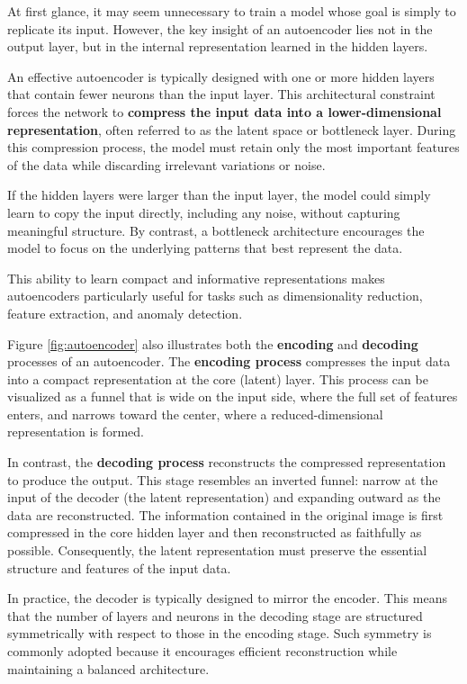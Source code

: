 At first glance, it may seem unnecessary to train a model whose goal is simply to replicate its input. However, the key insight of an autoencoder lies not in the output layer, but in the internal representation learned in the hidden layers.

An effective autoencoder is typically designed with one or more hidden layers that contain fewer neurons than the input layer. This architectural constraint forces the network to \textbf{compress the input data into a lower-dimensional representation}, often referred to as the latent space or bottleneck layer. During this compression process, the model must retain only the most important features of the data while discarding irrelevant variations or noise.

If the hidden layers were larger than the input layer, the model could simply learn to copy the input directly, including any noise, without capturing meaningful structure. By contrast, a bottleneck architecture encourages the model to focus on the underlying patterns that best represent the data.

This ability to learn compact and informative representations makes autoencoders particularly useful for tasks such as dimensionality reduction, feature extraction, and anomaly detection.

Figure \ref{fig:autoencoder} also illustrates both the \textbf{encoding} and \textbf{decoding} processes of an autoencoder. The \textbf{encoding process} compresses the input data into a compact representation at the core (latent) layer. This process can be visualized as a funnel that is wide on the input side, where the full set of features enters, and narrows toward the center, where a reduced-dimensional representation is formed.

In contrast, the \textbf{decoding process} reconstructs the compressed representation to produce the output. This stage resembles an inverted funnel: narrow at the input of the decoder (the latent representation) and expanding outward as the data are reconstructed. The information contained in the original image is first compressed in the core hidden layer and then reconstructed as faithfully as possible. Consequently, the latent representation must preserve the essential structure and features of the input data.

In practice, the decoder is typically designed to mirror the encoder. This means that the number of layers and neurons in the decoding stage are structured symmetrically with respect to those in the encoding stage. Such symmetry is commonly adopted because it encourages efficient reconstruction while maintaining a balanced architecture.

